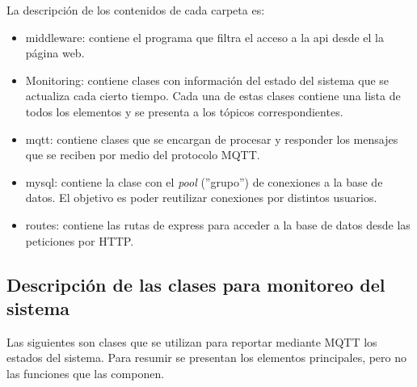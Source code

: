 La descripción de los contenidos de cada carpeta es:
\begin{itemize}
\item middleware: contiene el programa que filtra el acceso a la api desde el la página web.
\item Monitoring: contiene clases con información del estado del sistema que se actualiza cada cierto tiempo. Cada una de estas clases contiene una lista de todos los elementos y se presenta a los tópicos correspondientes.
\item mqtt: contiene clases que se encargan de procesar y responder los mensajes que se reciben por medio del protocolo MQTT.
\item mysql: contiene la clase con el \textit{pool} (''grupo'') de conexiones a la base de datos. El objetivo es poder reutilizar conexiones por distintos usuarios.
\item routes: contiene las rutas de express para acceder a la base de datos desde las peticiones por HTTP.
\end{itemize}

\subsection{Descripción de las clases para monitoreo del sistema}

Las siguientes son clases que se utilizan para reportar mediante MQTT los estados del sistema. Para resumir se presentan los elementos principales, pero no las funciones que las componen.

